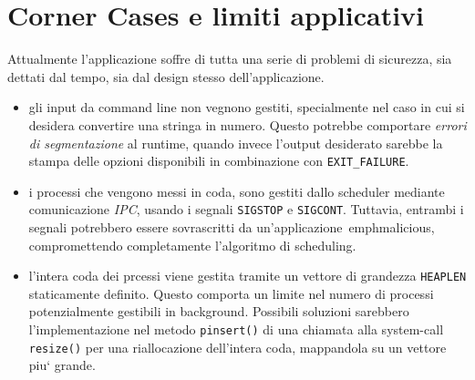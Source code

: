 \documentclass[11pt]{article}
\begin{document}
\section{Corner Cases e limiti applicativi}

Attualmente l'applicazione soffre di tutta una serie di problemi di sicurezza, sia dettati dal tempo, sia dal design stesso dell'applicazione.
\begin{itemize}
\item gli input da command line non vegnono gestiti, specialmente nel caso in cui si desidera convertire una stringa in numero. Questo potrebbe comportare \emph{errori di segmentazione} al runtime, quando invece l'output
 desiderato sarebbe la stampa delle opzioni disponibili  in combinazione con \texttt{EXIT\_FAILURE}.
 
 \item i processi che vengono messi in coda, sono gestiti dallo scheduler mediante comunicazione \emph{IPC}, usando i segnali \texttt{SIGSTOP} e \texttt{SIGCONT}. Tuttavia, entrambi i segnali potrebbero essere sovrascritti da un'applicazione \,emph{malicious}, compromettendo completamente l'algoritmo di scheduling.  
 
\item l'intera coda dei prcessi viene gestita tramite un vettore di grandezza \texttt{HEAPLEN} staticamente definito. Questo comporta un limite nel numero di processi potenzialmente gestibili in background. Possibili soluzioni sarebbero l'implementazione nel metodo \texttt{pinsert()} di una chiamata alla system-call \texttt{resize()} per una riallocazione dell'intera coda, mappandola su un vettore piu` grande.
\end{itemize}  
\end{document}

